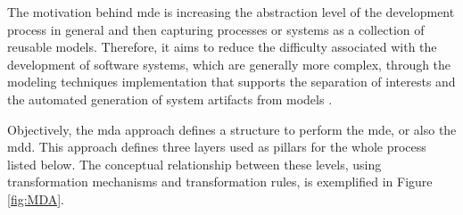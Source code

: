 The motivation behind \ac{mde} is increasing the abstraction level of the development process in general and then capturing processes or systems as a collection of reusable models.
Therefore, it aims to reduce the difficulty associated with the development of software systems, which are generally more complex, through the modeling techniques implementation that supports the separation of interests and the automated generation of system artifacts from models \cite{Batory:2015, Kleppe:2003}.


Objectively, the \ac{mda} approach defines a structure to perform the \ac{mde}, or also the \ac{mdd}.
This approach defines three layers used as pillars for the whole process \cite{Frantz:2012} listed below.
The conceptual relationship between these levels, using transformation mechanisms and transformation rules, is exemplified in Figure \ref{fig:MDA}.

